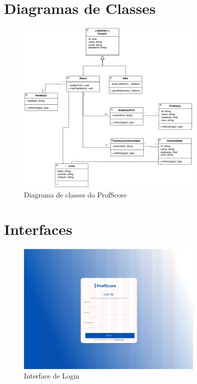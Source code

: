 \documentclass[12pt]{article}
\begin{document}
\section{Diagramas de Classes}

\begin{figure}[H] %
    \centering
    \includegraphics[width=0.8\textwidth]{diagramas/diag-classes.png}
    \caption{Diagrama de classes do ProfScore}
    \label{fig:diag-classes}
\end{figure}

\section{Interfaces}

\begin{figure}[H] %
    \centering
    \includegraphics[width=0.8\textwidth]{interfaces/i1-login.png}
    \caption{Interface de Login}
    \label{fig:i1-login}
\end{figure}
\end{document}
